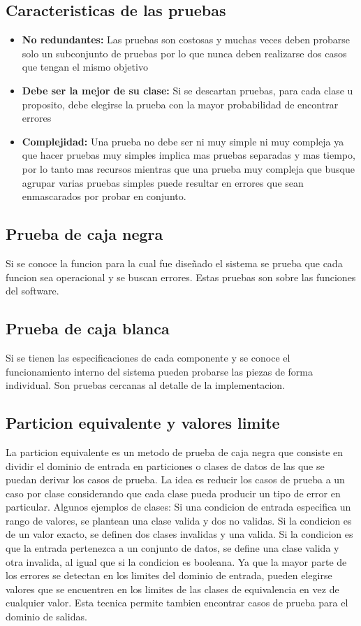 \documentclass[a4paper]{article}
\begin{document}
\subsection*{Caracteristicas de las pruebas}
\begin{itemize}
    \item \textbf{No redundantes:} Las pruebas son costosas y muchas veces deben probarse solo
    un subconjunto de pruebas por lo que nunca deben realizarse dos casos que tengan el mismo
    objetivo
    \item \textbf{Debe ser la mejor de su clase:} Si se descartan pruebas, para cada clase u 
    proposito, debe elegirse la prueba con la mayor probabilidad de encontrar errores
    \item \textbf{Complejidad:} Una prueba no debe ser ni muy simple ni muy compleja ya que
    hacer pruebas muy simples implica mas pruebas separadas y mas tiempo, por lo tanto mas recursos
    mientras que una prueba muy compleja que busque agrupar varias pruebas simples puede resultar
    en errores que sean enmascarados por probar en conjunto.
\end{itemize}

\subsection*{Prueba de caja negra}
Si se conoce la funcion para la cual fue diseñado el sistema se prueba que cada funcion sea 
operacional y se buscan errores. Estas pruebas son sobre las funciones del software.

\subsection*{Prueba de caja blanca}
Si se tienen las especificaciones de cada componente y se conoce el funcionamiento interno del 
sistema pueden probarse las piezas de forma individual. Son pruebas cercanas al detalle de la 
implementacion.

\subsection*{Particion equivalente y valores limite}
La particion equivalente es un metodo de prueba de caja negra que consiste en dividir el dominio
de entrada en particiones o clases de datos de las que se puedan derivar los casos de prueba. La
idea es reducir los casos de prueba a un caso por clase considerando que cada clase pueda producir
un tipo de error en particular. Algunos ejemplos de clases: Si una condicion de entrada especifica
un rango de valores, se plantean una clase valida y dos no validas. Si la condicion es de un valor 
exacto, se definen dos clases invalidas y una valida. Si la condicion es que la entrada pertenezca
a un conjunto de datos, se define una clase valida y otra invalida, al igual que si la condicion es
booleana.
Ya que la mayor parte de los errores se detectan en los limites del dominio de entrada, pueden 
elegirse valores que se encuentren en los limites de las clases de equivalencia en vez de cualquier
valor. Esta tecnica permite tambien encontrar casos de prueba para el dominio de salidas.%
\end{document}
